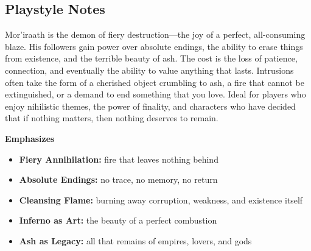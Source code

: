 \subsection*{Playstyle Notes}
Mor'iraath is the demon of fiery destruction---the joy of a perfect, all-consuming blaze. His followers gain power over absolute endings, the ability to erase things from existence, and the terrible beauty of ash. The cost is the loss of patience, connection, and eventually the ability to value anything that lasts. Intrusions often take the form of a cherished object crumbling to ash, a fire that cannot be extinguished, or a demand to end something that you love. Ideal for players who enjoy nihilistic themes, the power of finality, and characters who have decided that if nothing matters, then nothing deserves to remain.

\noindent\textbf{Emphasizes}
\begin{itemize}
  \item \textbf{Fiery Annihilation:} fire that leaves nothing behind
  \item \textbf{Absolute Endings:} no trace, no memory, no return
  \item \textbf{Cleansing Flame:} burning away corruption, weakness, and existence itself
  \item \textbf{Inferno as Art:} the beauty of a perfect combustion
  \item \textbf{Ash as Legacy:} all that remains of empires, lovers, and gods
\end{itemize}

